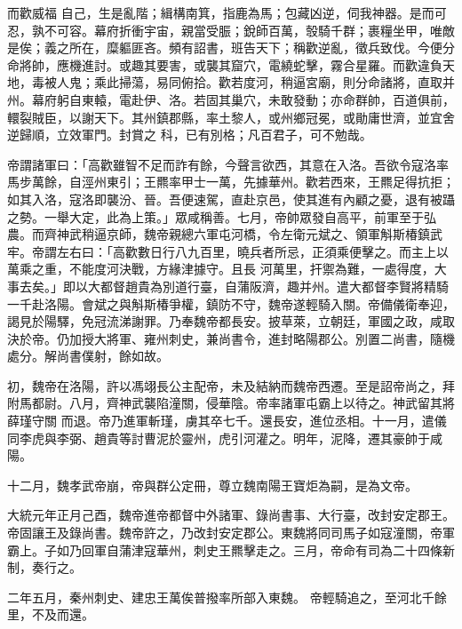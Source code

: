 \begin{pinyinscope}
 而歡威福
 自己，生是亂階；緝構南箕，指鹿為馬；包藏凶逆，伺我神器。是而可忍，孰不可容。幕府折衝宇宙，親當受脤；銳師百萬，彀騎千群；裹糧坐甲，唯敵是俟；義之所在，糜軀匪吝。頻有詔書，班告天下；稱歡逆亂，徵兵致伐。今便分命將帥，應機進討。或趣其要害，或襲其窟穴，電繞蛇擊，霧合星羅。而歡違負天地，毒被人鬼；乘此掃蕩，易同俯拾。歡若度河，稍逼宮廟，則分命諸將，直取并州。幕府躬自東轅，電赴伊、洛。若固其巢穴，未敢發動；亦命群帥，百道俱前，轘裂賊臣，以謝天下。其州鎮郡縣，率土黎人，或州鄉冠冕，或勛庸世濟，並宜舍逆歸順，立效軍門。封賞之
 科，已有別格；凡百君子，可不勉哉。



 帝謂諸軍曰：「高歡雖智不足而詐有餘，今聲言欲西，其意在入洛。吾欲令寇洛率馬步萬餘，自涇州東引；王羆率甲士一萬，先據華州。歡若西來，王羆足得抗拒；如其入洛，寇洛即襲汾、晉。吾便速駕，直赴京邑，使其進有內顧之憂，退有被躡之勢。一舉大定，此為上策。」眾咸稱善。七月，帝帥眾發自高平，前軍至于弘農。而齊神武稍逼京師，魏帝親總六軍屯河橋，令左衛元斌之、領軍斛斯椿鎮武牢。帝謂左右曰：「高歡數日行八九百里，曉兵者所忌，正須乘便擊之。而主上以萬乘之重，不能度河決戰，方緣津據守。且長
 河萬里，扞禦為難，一處得度，大事去矣。」即以大都督趙貴為別道行臺，自蒲阪濟，趣并州。遣大都督李賢將精騎一千赴洛陽。會斌之與斛斯椿爭權，鎮防不守，魏帝遂輕騎入關。帝備儀衛奉迎，謁見於陽驛，免冠流涕謝罪。乃奉魏帝都長安。披草萊，立朝廷，軍國之政，咸取決於帝。仍加授大將軍、雍州刺史，兼尚書令，進封略陽郡公。別置二尚書，隨機處分。解尚書僕射，餘如故。



 初，魏帝在洛陽，許以馮翊長公主配帝，未及結納而魏帝西遷。至是詔帝尚之，拜附馬都尉。八月，齊神武襲陷潼關，侵華陰。帝率諸軍屯霸上以待之。神武留其將薛瑾守關
 而退。帝乃進軍斬瑾，虜其卒七千。還長安，進位丞相。十一月，遣儀同李虎與李弼、趙貴等討曹泥於靈州，虎引河灌之。明年，泥降，遷其豪帥于咸陽。



 十二月，魏孝武帝崩，帝與群公定冊，尊立魏南陽王寶炬為嗣，是為文帝。



 大統元年正月己酉，魏帝進帝都督中外諸軍、錄尚書事、大行臺，改封安定郡王。帝固讓王及錄尚書。魏帝許之，乃改封安定郡公。東魏將同司馬子如寇潼關，帝軍霸上。子如乃回軍自蒲津寇華州，刺史王羆擊走之。三月，帝命有司為二十四條新制，奏行之。



 二年五月，秦州刺史、建忠王萬俟普撥率所部入東魏。
 帝輕騎追之，至河北千餘里，不及而還。




\end{pinyinscope}

